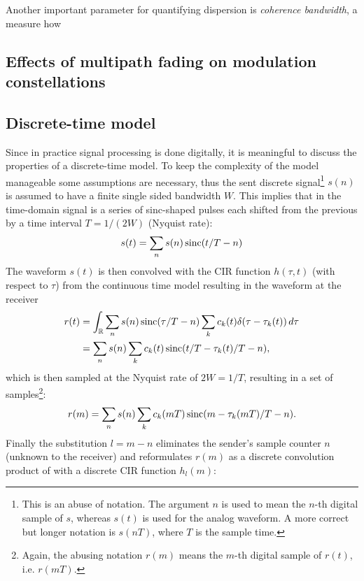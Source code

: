 Another important parameter for quantifying dispersion is \emph{coherence bandwidth}, a measure how 

\subsection{Effects of multipath fading on modulation constellations}


\subsection{Discrete-time model} \label{sec:discrete-time-model}


Since in practice signal processing is done digitally, it is meaningful to discuss the properties of a discrete-time model. To keep the complexity of the model manageable some assumptions are necessary, thus the sent discrete signal\footnote{This is an abuse of notation. The argument \(n\) is used to mean the \(n\)-th digital sample of \(s\), whereas \(s(t)\) is used for the analog waveform. A more correct but longer notation is \(s(nT)\), where \(T\) is the sample time.} \(s(n)\) is assumed to have a finite single sided bandwidth \(W\). This implies that in the time-domain signal is a series of sinc-shaped pulses each shifted from the previous by a time interval \(T = 1 / (2W)\) (Nyquist rate):
\begin{equation}
	s(t) = \sum_n s(n) \operatorname{sinc}(t/T - n)
\end{equation}
The waveform \(s(t)\) is then convolved with the CIR function \(h(\tau, t)\) (with respect to \(\tau\)) from the continuous time model resulting in the waveform at the receiver
\begin{align*}
	r(t) &= \int_ \mathbb{R} \sum_n s(n) \operatorname{sinc}(\tau / T - n) \sum_k c_k(t) \delta(\tau - \tau_k(t)) \,d\tau \\
	&= \sum_n s(n) \sum_k c_k(t) \operatorname{sinc}(t/T - \tau_k(t)/T - n),
\end{align*}
which is then sampled at the Nyquist rate of \(2W = 1/T\), resulting in a set of samples\footnote{Again, the abusing notation \(r(m)\) means the \(m\)-th digital sample of \(r(t)\), i.e. \(r(mT)\).}:
\[
	r(m) = \sum_n s(n) \sum_k c_k(mT) \operatorname{sinc}(m - \tau_k(mT)/T - n).
\]
Finally the substitution \(l = m - n\) eliminates the sender's sample counter \(n\) (unknown to the receiver) and reformulates \(r(m)\) as a discrete convolution product of with a discrete CIR function \(h_l(m)\):
